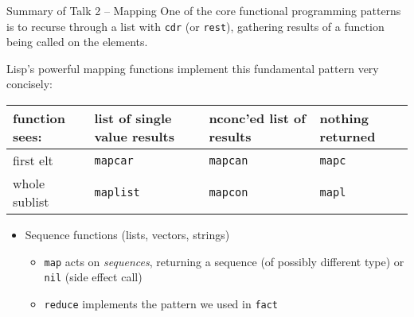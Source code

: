 \documentclass[presentation]{beamer}
\begin{document}
\begin{frame}{Summary of Talk 2 -- Mapping}
  One of the core functional programming patterns is to recurse through a list with \texttt{cdr} (or \texttt{rest}), gathering results of a function being called on the elements.

  \medskip
  Lisp's powerful mapping functions implement this fundamental pattern very concisely:
  \begin{tabularx}{\linewidth}{|l|X|X|X|}
    \hline function sees: & list of single value results & nconc'ed list of results & nothing returned \\
    \hline\hline first elt & \texttt{mapcar} & \texttt{mapcan} & \texttt{mapc} \\
    \hline whole sublist & \texttt{maplist} & \texttt{mapcon} & \texttt{mapl} \\
    \hline
  \end{tabularx}

  \medskip
  \begin{itemize}
  \item Sequence functions (lists, vectors, strings)
    \begin{itemize}
    \item \texttt{map} acts on \emph{sequences}, returning a sequence (of possibly different type) or \texttt{nil} (side effect call)
    \item  \texttt{reduce} implements the pattern we used in \texttt{fact}
    \end{itemize}
  \end{itemize}
\end{frame}
\end{document}

